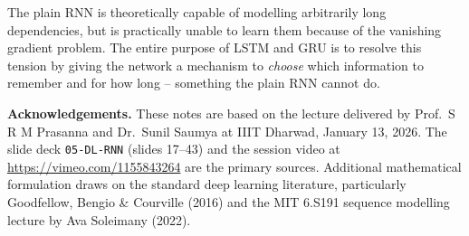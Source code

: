 \documentclass[12pt,a4paper]{article}
\begin{document}
\begin{keyinsight}[title=The Central Tension of Plain RNNs]
The plain RNN is theoretically capable of modelling arbitrarily long
dependencies, but is practically unable to learn them because of the vanishing
gradient problem.  The entire purpose of LSTM and GRU is to resolve this
tension by giving the network a mechanism to \emph{choose} which information to
remember and for how long -- something the plain RNN cannot do.
\end{keyinsight}

\vspace{1cm}
\noindent\textbf{Acknowledgements.}  These notes are based on the lecture
delivered by Prof.\ S R M Prasanna and Dr.\ Sunil Saumya at IIIT Dharwad,
January 13, 2026.  The slide deck \texttt{05-DL-RNN} (slides 17--43) and the
session video at \url{https://vimeo.com/1155843264} are the primary sources.
Additional mathematical formulation draws on the standard deep learning
literature, particularly Goodfellow, Bengio \& Courville (2016) and the MIT
6.S191 sequence modelling lecture by Ava Soleimany (2022).
\end{document}
